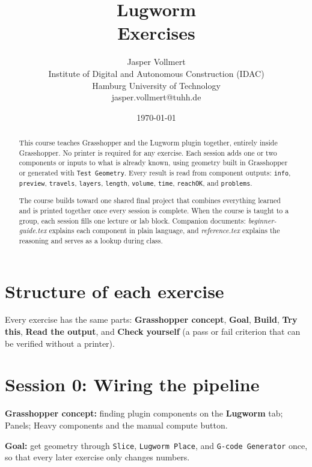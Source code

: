 \documentclass[11pt]{article}
\title{\color{lugwormblue}\textbf{Lugworm}\\[0.3em]\Large Exercises}
\author{Jasper Vollmert \\ \small Institute of Digital and Autonomous Construction (IDAC) \\ \small Hamburg University of Technology \\ \small jasper.vollmert@tuhh.de}
\date{\small \today}
\newcommand{\param}[1]{\texttt{#1}}
\newcommand{\exlabel}[1]{\par\vspace{0.3em}\noindent\textbf{#1:}\enspace}
\begin{document}
\maketitle

\begin{abstract}
\noindent This course teaches Grasshopper and the Lugworm plugin
together, entirely inside Grasshopper. No printer is required for any
exercise. Each session adds one or two components or inputs to what is
already known, using geometry built in Grasshopper or generated with
\param{Test Geometry}. Every result is read from component
outputs: \param{info}, \param{preview}, \param{travels}, \param{layers},
\param{length}, \param{volume}, \param{time}, \param{reachOK}, and
\param{problems}.

The course builds toward one shared final project that combines
everything learned and is printed together once every session is
complete. When the course is taught to a group, each session fills one
lecture or lab block. Companion documents: \emph{beginner-guide.tex}
explains each component in plain language, and \emph{reference.tex}
explains the reasoning and serves as a lookup during class.
\end{abstract}

\tableofcontents
\newpage

\section{Structure of each exercise}

Every exercise has the same parts: \textbf{Grasshopper concept},
\textbf{Goal}, \textbf{Build}, \textbf{Try this}, \textbf{Read the
output}, and \textbf{Check yourself} (a pass or fail criterion that can
be verified without a printer).

\section{Session 0: Wiring the pipeline}

\exlabel{Grasshopper concept} finding plugin components on the
\textbf{Lugworm} tab; Panels; Heavy components and the manual compute
button.

\exlabel{Goal} get geometry through \param{Slice}, \param{Lugworm
Place}, and \param{G-code Generator} once, so that every later
exercise only changes numbers.
\end{document}
